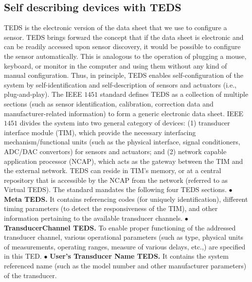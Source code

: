 \documentclass[conference]{IEEEtran}
\begin{document}
\subsection{Self describing devices with TEDS}
TEDS is the electronic version of the data sheet that we use to configure a sensor. 
TEDS brings forward the concept that if the data sheet is electronic and can be readily accessed upon sensor discovery, it would be possible
to configure the sensor automatically. 
This is analogous to the operation of plugging a mouse, keyboard, or monitor in the computer and using them without any kind of manual
configuration.
Thus, in principle, TEDS enables self-configuration of the system by self-identification and self-description of sensors and actuators (i.e., plug-and-play).
\newline
\indent
The IEEE $1451$\cite{1451} standard defines TEDS as a collection of multiple sections (such as sensor identification, calibration, correction data and manufacturer-related information) to form a generic electronic data sheet.
IEEE $1451$ divides the system into two general category of devices: (1) transducer interface module (TIM), which provide the necessary interfacing mechanism/functional units (such as the physical interface, signal conditioners, ADC/DAC convertors) for sensors and actuators; and (2) network capable application processor (NCAP), which acts as the gateway between the TIM and the external network.
TEDS can reside in TIM's memory, or at a central repository that is accessible by the NCAP from the network (referred to as Virtual TEDS).
The standard mandates the following four TEDS sections.
\vspace{1mm}
\newline
\noindent
$\bullet$ \textbf{Meta TEDS.} It contains referencing codes (for uniquely identification), different timing parameters (to detect the responsiveness of the TIM), and other information pertaining to the available transducer channels.
\vspace{1mm}
\newline
\noindent
$\bullet$ \textbf{TransducerChannel TEDS.} To enable proper functioning of the addressed transducer channel, various operational parameters (such as type, physical units of measurements, operating ranges, measure of various delays, etc.,) are specified in this TED.
\vspace{1mm}
\newline
\noindent
$\bullet$ \textbf{User's Transducer Name TEDS.} It contains the system referenced name (such as the model number and other manufacturer parameters) of the transducer.
\end{document}

